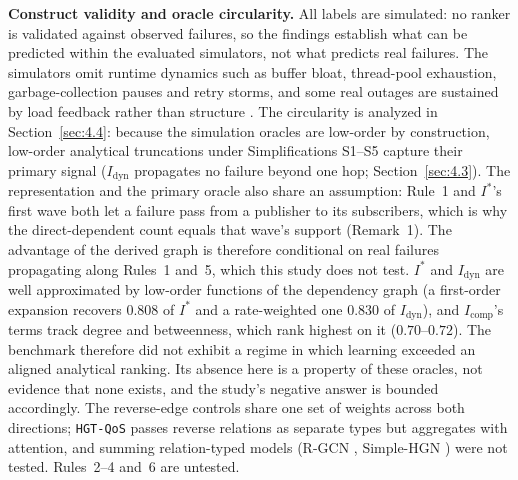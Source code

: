 \noindent\textbf{Construct validity and oracle circularity.} All labels are simulated: no ranker is validated against observed failures, so the findings establish what can be predicted within the evaluated simulators, not what predicts real failures. The simulators omit runtime dynamics such as buffer bloat, thread-pool exhaustion, garbage-collection pauses and retry storms, and some real outages are sustained by load feedback rather than structure \cite{bronson2021metastable,huang2022metastable}. The circularity is analyzed in Section~\ref{sec:4.4}: because the simulation oracles are low-order by construction, low-order analytical truncations under Simplifications S1--S5 capture their primary signal ($I_{\text{dyn}}$ propagates no failure beyond one hop; Section~\ref{sec:4.3}). The representation and the primary oracle also share an assumption: Rule~1 and $I^*$'s first wave both let a failure pass from a publisher to its subscribers, which is why the direct-dependent count equals that wave's support (Remark~1). The advantage of the derived graph is therefore conditional on real failures propagating along Rules~1 and~5, which this study does not test. $I^*$ and $I_{\text{dyn}}$ are well approximated by low-order functions of the dependency graph (a first-order expansion recovers $0.808$ of $I^*$ and a rate-weighted one $0.830$ of $I_{\text{dyn}}$), and $I_{\text{comp}}$'s terms track degree and betweenness, which rank highest on it ($0.70$--$0.72$). The benchmark therefore did not exhibit a regime in which learning exceeded an aligned analytical ranking. Its absence here is a property of these oracles, not evidence that none exists, and the study's negative answer is bounded accordingly. The reverse-edge controls share one set of weights across both directions; \texttt{HGT-QoS} passes reverse relations as separate types but aggregates with attention, and summing relation-typed models (R-GCN \cite{schlichtkrull2018rgcn}, Simple-HGN \cite{lv2021revisiting}) were not tested. Rules~2--4 and~6 are untested.

